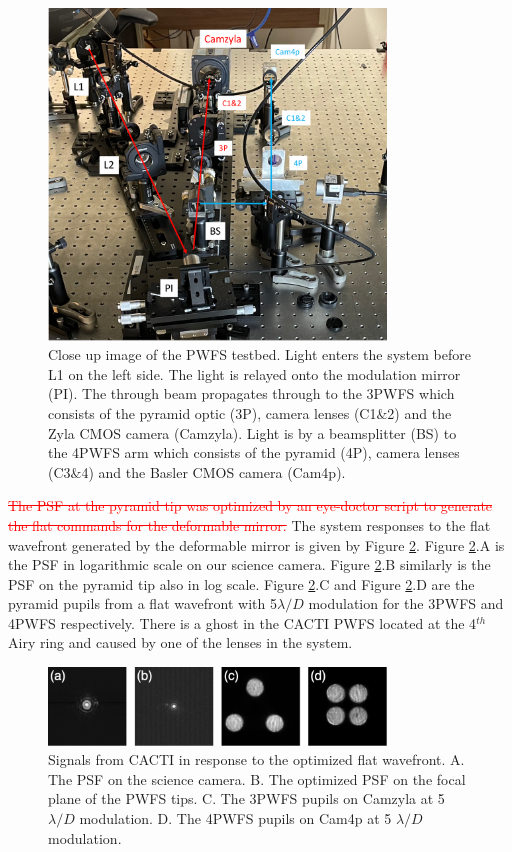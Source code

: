\documentclass[12pt]{spieman}  %
\newcommand{\jrmrmv}[1]{\textcolor{red}{\sout{#1}}}
\begin{document}
\begin{spacing}{2}
\begin{figure}
    \centering
    \includegraphics[width=0.8\textwidth]{PWFStestbed.png}
    \caption{Close up image of the PWFS testbed. Light enters the system before L1 on the left side. The light is relayed onto the modulation mirror (PI). The through beam propagates through to the 3PWFS which consists of the pyramid optic (3P), camera lenses (C1$\&$2) and the Zyla CMOS camera (Camzyla). Light is by a beamsplitter (BS) to the 4PWFS arm which consists of the pyramid (4P), camera lenses (C3$\&$4) and the Basler CMOS camera (Cam4p).  }
    \label{fig:PWFStestbed}
\end{figure}


\jrmrmv{The PSF at the pyramid tip was optimized by an eye-doctor script to generate the flat commands for the deformable mirror.} The system responses to the flat wavefront generated by the deformable mirror is given by Figure \ref{fig:flatCACTI}. Figure \ref{fig:flatCACTI}.A is the PSF in logarithmic scale on our science camera. Figure \ref{fig:flatCACTI}.B similarly is the PSF on the pyramid tip also in log scale. Figure  \ref{fig:flatCACTI}.C and Figure \ref{fig:flatCACTI}.D are the pyramid pupils from a flat wavefront with 5$\lambda/D$ modulation for the 3PWFS and 4PWFS respectively. There is a ghost in the CACTI PWFS located at the 4$^{th}$ Airy ring and caused by one of the lenses in the system. 

\begin{figure}
    \centering
    \includegraphics[width=0.8\textwidth]{flatCACTI.png}
    \caption{Signals from CACTI in response to the optimized flat wavefront. A. The PSF on the science camera. B. The optimized PSF on the focal plane of the PWFS tips. C. The 3PWFS pupils on Camzyla at 5 $\lambda/D$ modulation. D. The 4PWFS pupils on Cam4p at 5 $\lambda/D$ modulation.}
    \label{fig:flatCACTI}
\end{figure}



\end{spacing}
\end{document}
